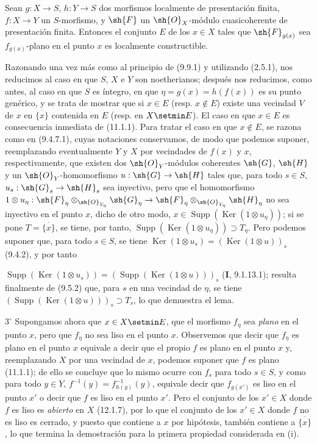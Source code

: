 \begin{lemma}[17.7.11.1]
\label{IV.17.7.11.1}
Sean $g:X\to S$, $h:Y\to S$ dos morfismos localmente de presentación finita, $f:X\to Y$ un $S$-morfismo, y $\sh{F}$ un $\sh{O}_X$-módulo cuasicoherente de presentación finita. Entonces el conjunto $E$ de los $x\in X$ tales que $\sh{F}_{g(x)}$ sea $f_{g(x)}$-plano en el punto $x$ es localmente constructible.
\end{lemma}

Razonando una vez más como al principio de (9.9.1) y utilizando (2.5.1), nos reducimos al caso en que $S$, $X$ e $Y$ son noetherianos; después nos reducimos, como antes, al caso en que $S$ es íntegro, en que $\eta=g(x)=h(f(x))$ es su punto genérico, y se trata de mostrar que si $x\in E$ (resp. $x\notin E$) existe una vecindad $V$ de $x$ en $\overline{\{x\}}$ contenida en $E$ (resp. en $X\setmin E$). El caso en que $x\in E$ es consecuencia inmediata de (11.1.1). Para tratar el caso en que $x\notin E$, se razona como en (9.4.7.1), cuyas notaciones conservamos, de modo que podemos suponer, reemplazando eventualmente $Y$ y $X$ por vecindades de $f(x)$ y $x$, respectivamente, que existen dos $\sh{O}_Y$-módulos coherentes $\sh{G}$, $\sh{H}$ y un $\sh{O}_Y$-homomorfismo $u:\sh{G}\to\sh{H}$ tales que, para todo $s\in S$, $u_s:\sh{G}_s\to\sh{H}_s$ sea inyectivo, pero que el homomorfismo $1\otimes u_\eta:\sh{F}_\eta\otimes_{\sh{O}_{Y_\eta}}\sh{G}_\eta\to\sh{F}_\eta\otimes_{\sh{O}_{Y_\eta}}\sh{H}_\eta$ no sea inyectivo en el punto $x$, dicho de otro modo, $x\in\operatorname{Supp}(\operatorname{Ker}(1\otimes u_\eta))$; si se pone $T=\overline{\{x\}}$, se tiene, por tanto, $\operatorname{Supp}(\operatorname{Ker}(1\otimes u_\eta))\supset T_\eta$. Pero podemos suponer que, para todo $s\in S$, se tiene $\operatorname{Ker}(1\otimes u_s)=(\operatorname{Ker}(1\otimes u))_s$ (9.4.2), y por tanto


$\operatorname{Supp}(\operatorname{Ker}(1\otimes u_s))=(\operatorname{Supp}(\operatorname{Ker}(1\otimes u)))_s$ (\textbf I, 9.1.13.1); resulta finalmente de (9.5.2) que, para $s$ en una vecindad de $\eta$, se tiene $(\operatorname{Supp}(\operatorname{Ker}(1\otimes u)))_s\supset T_s$, lo que demuestra el lema.

$3^\circ$ Supongamos ahora que $x\in X\setmin E$, que el morfismo $f_\eta$ sea \emph{plano} en el punto $x$, pero que $f_\eta$ no sea liso en el punto $x$. Observemos que decir que $f_\eta$ es plano en el punto $x$ equivale a decir que el propio $f$ es plano en el punto $x$ y, reemplazando $X$ por una vecindad de $x$, podemos suponer que $f$ es plano (11.1.1); de ello se concluye que lo mismo ocurre con $f_s$ para todo $s\in S$, y como para todo $y\in Y$, $f^{-1}(y)=f_{h(y)}^{-1}(y)$, equivale decir que $f_{g(x')}$ es liso en el punto $x'$ o decir que $f$ es liso en el punto $x'$. Pero el conjunto de los $x'\in X$ donde $f$ es liso es \emph{abierto} en $X$ (12.1.7), por lo que el conjunto de los $x'\in X$ donde $f$ no es liso es cerrado, y puesto que contiene a $x$ por hipótesis, también contiene a $\overline{\{x\}}$, lo que termina la demostración para la primera propiedad considerada en (i).

